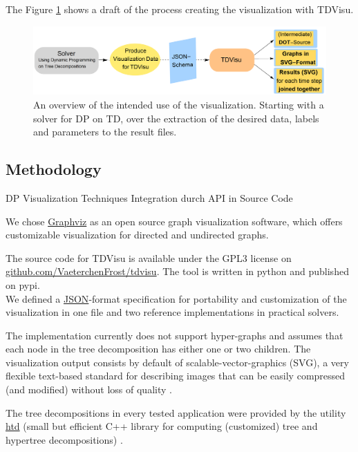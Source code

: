 \documentclass[a4paper, 12pt, bibliography=totoc]{scrartcl}
\begin{document}
The Figure \ref{fig:overviewprog} shows a draft of the process creating the visualization with TDVisu.

\begin{figure}
	\centering
		\includegraphics[width=1\linewidth]{images/OverviewProgram.png}
		
	\caption{An overview of the intended use of the visualization. Starting with a solver for DP on TD, over the extraction of the desired data, labels and parameters to the result files.}
	\label{fig:overviewprog}
\end{figure}


\subsection{Methodology}
DP
Visualization Techniques
Integration durch API in Source Code

We chose \href{https://graphviz.org/}{Graphviz} as an open source graph visualization software, which offers customizable visualization for directed and undirected graphs.

The source code for TDVisu is available under the GPL3 license on \url{github.com/VaeterchenFrost/tdvisu}. The tool is written in python and published on pypi.\\


We defined a \href{https://www.json.org/json-en.html}{JSON}-format specification for portability and customization of the visualization in one file and two reference implementations in practical solvers.

The implementation currently does not support hyper-graphs and assumes that each node in the tree decomposition has either one or two children.
The visualization output consists by default of scalable-vector-graphics (SVG), a very flexible text-based standard for describing images that can be easily compressed (and modified) without loss of quality \cite{SVGMozilla}.

The tree decompositions in every tested application were provided by the utility \href{https://github.com/mabseher/htd}{htd} (small but efficient C++ library for computing (customized) tree and hypertree decompositions) \cite{htd}.
\end{document}
